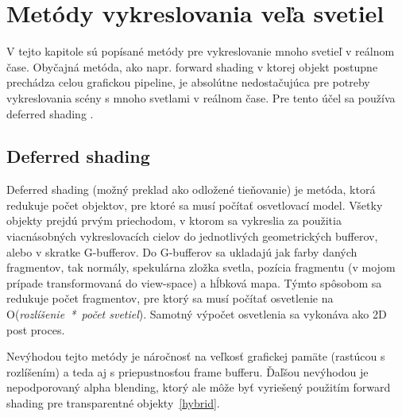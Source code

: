 \chapter{Metódy vykreslovania veľa svetiel}
V tejto kapitole sú popísané metódy pre vykreslovanie mnoho svetieľ v reálnom čase. Obyčajná metóda, ako napr. forward shading v ktorej objekt postupne prechádza celou grafickou pipeline, je absolútne nedostačujúca pre potreby vykreslovania scény s mnoho svetlami v reálnom čase. Pre tento účel sa používa deferred shading \cite{def-vs-for}.

\section{Deferred shading}
\label{deferred shading}
Deferred shading (možný preklad ako odložené tieňovanie) je metóda, ktorá redukuje počet objektov, pre ktoré sa musí počítať osvetlovací model. Všetky objekty prejdú prvým priechodom, v ktorom sa vykreslia za použitia viacnásobných vykreslovacích cielov do jednotlivých geometrických bufferov, alebo v skratke G-bufferov. Do G-bufferov sa ukladajú jak farby daných fragmentov, tak normály, spekulárna zložka svetla, pozícia fragmentu (v mojom prípade transformovaná do view-space) a hĺbková mapa. Týmto spôsobom sa redukuje počet fragmentov, pre ktorý sa musí počítať osvetlenie na O(\textit{rozlíšenie~*~počet svetiel}). Samotný výpočet osvetlenia sa vykonáva ako 2D post proces. 

Nevýhodou tejto metódy je náročnosť na veľkosť grafickej pamäte (rastúcou s rozlíšením) a teda aj s priepustnosťou frame bufferu. Ďaľšou nevýhodou je nepodporovaný alpha blending, ktorý ale môže byť vyriešený použitím forward shading pre transparentné objekty~\ref{hybrid}.

